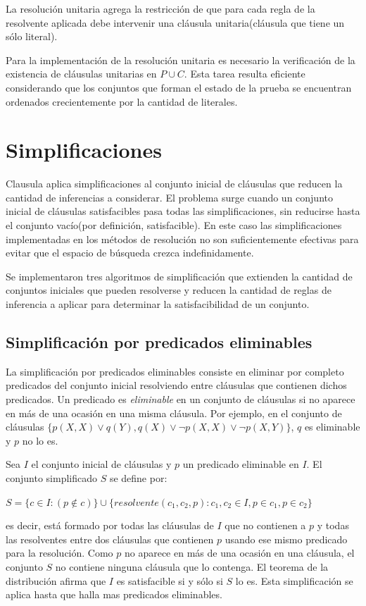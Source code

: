 \documentclass[a4paper,12pt]{article}
\begin{document}
La resolución unitaria agrega la restricción de que para cada regla de la resolvente aplicada debe
intervenir una cláusula unitaria(cláusula que tiene un sólo literal).

Para la implementación de la resolución unitaria es necesario la verificación de la
existencia de cláusulas unitarias en $P \cup C$. Esta tarea resulta eficiente considerando
que los conjuntos que forman el estado de la prueba se encuentran ordenados crecientemente por
la cantidad de literales.
\section{Simplificaciones}
Clausula aplica simplificaciones al conjunto inicial de cláusulas que reducen la cantidad
de inferencias a considerar. El problema surge cuando un conjunto inicial de cláusulas satisfacibles
pasa todas las simplificaciones, sin reducirse hasta el conjunto vacío(por definición, satisfacible). En
este caso las simplificaciones implementadas en los métodos de resolución no son suficientemente efectivas
para evitar que el espacio de búsqueda crezca indefinidamente.

Se implementaron tres algoritmos de simplificación que extienden la cantidad de conjuntos iniciales que
pueden resolverse y reducen la cantidad de reglas de inferencia a aplicar para determinar la satisfacibilidad
de un conjunto.
\subsection{Simplificación por predicados eliminables}
La simplificación por predicados eliminables\cite{Gelperin} consiste en eliminar por completo predicados del conjunto
inicial resolviendo entre cláusulas que contienen dichos predicados. Un predicado es \emph{eliminable} en un
conjunto de cláusulas si no aparece en más de una ocasión en una misma cláusula. Por ejemplo, en el conjunto
de cláusulas $\{p(X,X) \lor q(Y), q(X) \lor \lnot p(X,X) \lor \lnot p(X,Y)\}$, $q$ es eliminable y $p$ no lo es.

Sea $I$ el conjunto inicial de cláusulas y $p$ un predicado eliminable en $I$. El conjunto simplificado $S$
se define por:

 $S = \{c \in I : (p \notin c)\} \cup \{resolvente(c_1,c_2,p) : c_1,c_2  \in I, p\in c_1, p\in c_2\}$

es decir, está formado por todas las cláusulas de $I$ que no contienen a $p$ y todas las resolventes
entre dos cláusulas que contienen $p$ usando ese mismo predicado para la resolución. Como $p$ no aparece en más de una ocasión en una cláusula,
el conjunto $S$ no contiene ninguna cláusula que lo contenga. El teorema de la distribución\cite{Gelperin} afirma que $I$ es 
satisfacible si y sólo si $S$ lo es. Esta simplificación se aplica hasta que halla mas predicados eliminables.
\end{document}
